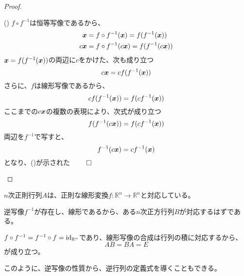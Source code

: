 \documentclass[../../../topic_linear-algebra]{subfiles}
\begin{document}
\begin{proof}
  \begin{subpattern}{()}
    $f \circ f^{-1}$は恒等写像であるから、
    \begin{align*}
      \vb*{x}  & = f \circ f^{-1}(\vb*{x}) = f(f^{-1}(\vb*{x}))   \\
      c\vb*{x} & = f \circ f^{-1}(c\vb*{x}) = f(f^{-1}(c\vb*{x}))
    \end{align*}
    $\vb*{x}= f(f^{-1}(\vb*{x}))$の両辺に$c$をかけた、次も成り立つ
    \begin{equation*}
      c\vb*{x} = c f(f^{-1}(\vb*{x}))
    \end{equation*}
    さらに、$f$は線形写像であるから、
    \begin{equation*}
      c f(f^{-1}(\vb*{x})) = f(c f^{-1}(\vb*{x}))
    \end{equation*}
    ここまでの$c\vb*{x}$の複数の表現により、次式が成り立つ
    \begin{equation*}
      f(f^{-1}(c\vb*{x})) = f(c f^{-1}(\vb*{x}))
    \end{equation*}
    両辺を$f^{-1}$で写すと、
    \begin{equation*}
      f^{-1}(c\vb*{x}) = c f^{-1}(\vb*{x})
    \end{equation*}
    となり、()が示された $\qed$
  \end{subpattern}
\end{proof}

\br

$n$次正則行列$A$は、正則な線形変換$f\colon \mathbb{R}^n \to \mathbb{R}^n$と対応している。

逆写像$f^{-1}$が存在し、線形であるから、ある$n$次正方行列$B$が対応するはずである。

\br

$f \circ f^{-1} = f^{-1} \circ f = \operatorname{id}_{\mathbb{R}^n}$であり、線形写像の合成は行列の積に対応するから、
\begin{equation*}
  AB = BA = E
\end{equation*}
が成り立つ。

\br

このように、逆写像の性質から、逆行列の定義式を導くこともできる。
\end{document}
